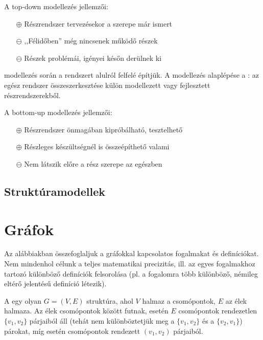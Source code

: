 A top-down modellezés jellemzői:

\begin{itemize}
\item[$\oplus$] Részrendszer tervezésekor a szerepe már ismert
\item[$\ominus$] ,,Félidőben'' még nincsenek működő részek
\item[$\ominus$] Részek problémái, igényei későn derülnek ki
\end{itemize}

\begin{definicio}
	 modellezés során a rendszert alulról felfelé építjük. A modellezés alaplépése a : az egész rendszer összeszerkesztése külön modellezett vagy fejlesztett részrendszerekből.
\end{definicio}

A bottom-up modellezés jellemzői:

\begin{itemize}
\item[$\oplus$] Részrendszer önmagában kipróbálható, tesztelhető
\item[$\oplus$] Részleges készültségnél is összeépíthető valami
\item[$\ominus$] Nem látszik előre a rész szerepe az egészben
\end{itemize}



\subsection{Struktúramodellek}



\section{Gráfok}
\label{sec:graf}

Az alábbiakban összefoglaljuk a gráfokkal kapcsolatos fogalmakat és definíciókat. Nem mindenhol célunk a teljes matematikai precizitás, ill. az egyes fogalmakhoz tartozó különböző definíciók felsorolása (pl. a  fogalomra több különböző, némileg eltérő jelentésű definíció létezik).


\begin{definicio}
A  egy olyan $G = (V, E)$ struktúra, ahol $V$ halmaz a csomópontok, $E$ az élek halmaza. Az élek csomópontok között futnak,  esetén $E$ csomópontok rendezetlen $\{v_1, v_2\}$ párjaiból áll (tehát nem különböztetjük meg a $\{v_1, v_2\}$ és a $\{v_2, v_1\}$) párokat, míg  esetén csomópontok rendezett $(v_1, v_2)$ párjaiból.
\end{definicio}

